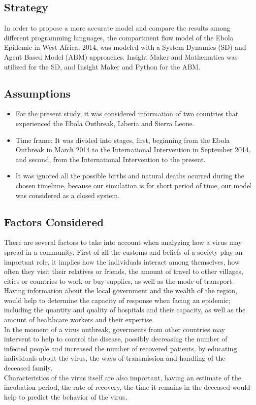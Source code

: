\documentclass[10pt]{article}
\begin{document}
\subsection{Strategy}
In order to propose a more accurate model and compare the results among different programming  languages, the compartment flow model of the Ebola Epidemic in West Africa, 2014, was modeled with a System Dynamics (SD) and Agent Based Model (ABM) approaches.  Insight Maker and Mathematica was utilized  for the SD, and Insight Maker and Python for the ABM.

\subsection{Assumptions}
\begin{itemize}
\item For the present study, it was considered information of two countries that experienced the Ebola Outbreak, Liberia and Sierra Leone.
\item Time frame: It was divided into stages, first, beginning from the Ebola Outbreak in March 2014 to the International Intervention in September 2014, and second, from the International Intervention to the present.
\item It was ignored all the possible births and natural deaths ocurred during the chosen timelime, because our simulation is for short period of time, our model was considered as a closed system.
\end{itemize}

\subsection{Factors Considered}
There are several factors to take into account when analyzing how a virus may spread in a community. First of all the customs and beliefs of a society play an important role, it implies how the individuals interact among themselves, how often they visit their relatives or friends, the amount of travel to other villages, cities or countries to work or buy supplies, as well as the mode of transport.\\
Having information about the local government and the wealth of the region, would help to determine the capacity of response when facing an epidemic; including the quantity and quality of hospitals and their capacity, as well as the amount of healthcare workers and their expertise.\\
In the moment of a virus outbreak, goverments from other countries may intervent to help to control the disease, possibly decreasing the number of infected people and increased the number of recovered patients, by educating individuals about the virus, the ways of transmission and handling of the deceased family. \\
Characteristics of the virus itself are also important, having an estimate of the incubation period, the rate of recovery, the time it remains in the deceased would help to predict the behavior of the virus.\\
\end{document}
